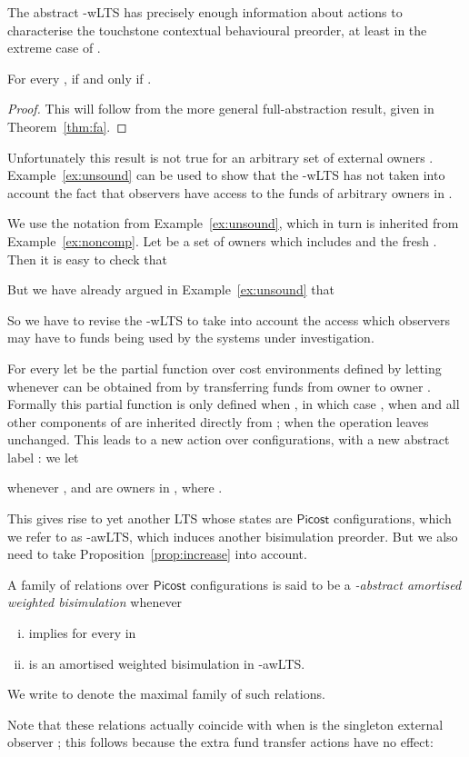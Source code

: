 \documentclass{LMCS}
\newcommand{\pfn}[1]{\mathsf{#1}}  \newcommand{\cfn}[1]{\mathsf{#1}}  \newcommand{\ownfnt}[1]{{\mathsf{#1}}}
\newcommand{\picost}{\ensuremath{\pfn{Picost}}\xspace}
\newcommand{\EndDefBox}{\null\hfill}
\newcommand{\boxHere}{\global\let\EndProof\empty\EndDefBox}
\begin{document}
The abstract -wLTS has precisely enough information about
actions to characterise the touchstone contextual behavioural
preorder, at least in the extreme case of .
\begin{thm}\label{thm:externalfa}
   For every ,   if and only if 
  . 
\end{thm}
\begin{proof}
  This will follow from the more general full-abstraction result, given in Theorem~\ref{thm:fa}.
\end{proof}
Unfortunately this result is not true for an arbitrary set of external owners . 
Example~\ref{ex:unsound} can be used to show that the -wLTS has not taken into account the fact that 
observers have access to the funds of arbitrary owners in .

\begin{exa}\label{ex:unsound2}
  We use the notation from Example~\ref{ex:unsound}, which in turn is inherited from
Example~\ref{ex:noncomp}. Let  be a set of owners which includes  and the fresh .
Then it is easy to check that

But we have already argued in Example~\ref{ex:unsound} that 

\boxHere
\end{exa}
So we have to revise the -wLTS to take into account the access which observers may have to funds being used by
the systems under investigation. 
\begin{defi}\label{def:fundtransfer}
  For every  let  be the partial
  function over cost environments defined by letting  whenever  can be obtained from
   by transferring  funds from owner  to owner
  .  Formally this partial function is only defined when 
  , in which case  
  , when  and
  all other components of  are inherited directly from
  ; when  the operation leaves 
  unchanged.  This leads to a new action over configurations, with a
  new abstract label : we let
 
  whenever , and  are owners 
in , where 
 .
\boxHere
\end{defi}
This gives rise to yet another LTS whose states are \picost
configurations, which we refer to as -awLTS, which induces
another bisimulation preorder. But we also need to take
Proposition~\ref{prop:increase} into account.
\begin{defi}\label{def:aamort}
  A family of relations over \picost configurations  is said to be a \emph{-abstract amortised weighted
    bisimulation} whenever
  \begin{enumerate}[(i)]
  \item  implies  for
every  in 

  \item  is an amortised weighted
    bisimulation in -awLTS. 
  \end{enumerate}
We write  to denote the maximal family of such relations. \boxHere
\end{defi}
Note that these relations  actually coincide with  when 
 is the singleton external observer ; this follows because the extra fund transfer actions
have no effect:
\end{document}

